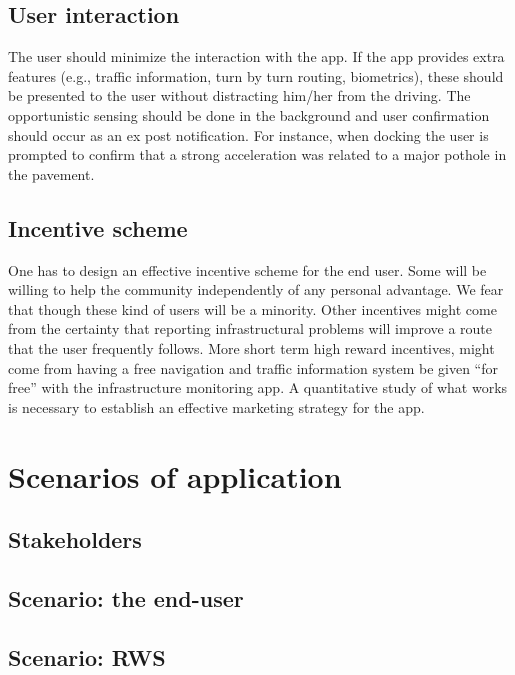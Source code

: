 \documentclass[preprint,12pt]{elsarticle}
\theoremstyle{definition}
\begin{document}
\subsection{User interaction}

The user should minimize the interaction with the app. If the app
provides extra features (e.g., traffic information, turn by turn
routing, biometrics), these should be presented to the user without
distracting him/her from the driving. The opportunistic sensing should
be done in the background and user confirmation should occur as an ex
post notification. For instance, when docking the user is prompted to
confirm that a strong acceleration was related to a major pothole in
the pavement. 


\subsection{Incentive scheme}

One has to design an effective incentive scheme for the end user. Some
will be willing to help the community independently of any personal
advantage. We fear that though these kind of users will be a
minority. Other incentives might come from the certainty that
reporting infrastructural problems will improve a route that the user
frequently follows. More short term high reward incentives, might come
from having a free navigation and traffic information system be given
``for free'' with the infrastructure monitoring app. A quantitative
study of what works is necessary to establish an effective marketing
strategy for the app.


\section{Scenarios of application}

\subsection{Stakeholders}

\subsection{Scenario: the end-user}

\subsection{Scenario: RWS}
\end{document}
